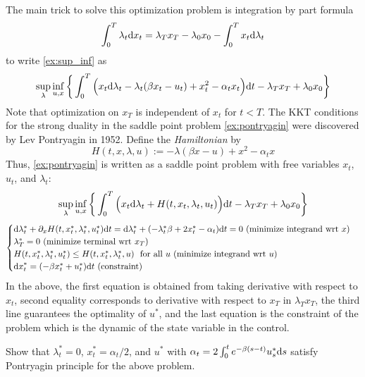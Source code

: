 \documentclass[11pt]{book}
\newcommand{\dd}{\text{\normalfont d}}
\newcommand{\dt}{\text{\normalfont d}t}
\newcommand{\ds}{\text{\normalfont d}s}
\newcommand{\dx}{\text{\normalfont d}x}
\begin{document}
The main trick to solve this optimization problem is integration by part formula
\begin{equation}\label{eqn:pontryagin_ibp}
    \int_0^T \lambda_t {\dx}_t = \lambda_T x_T - \lambda_0 x_0 - \int_0^T x_t{\dd}\lambda_t
\end{equation}
to write 
\eqref{ex:sup_inf} as
\begin{equation}\label{ex:pontryagin}
    \sup_{\lambda}\inf_{u,x}\bigg\{\int_0^T\Big(x_t {\dd}\lambda_t-\lambda_t( \beta x_t - u_t )+ x_t^2 - \alpha_t x_t \Big) {{\dt}} - \lambda_T x_T + \lambda_0 x_0\bigg\}
\end{equation}
Note that optimization on $x_T$ is independent of  $x_t$ for $t<T$. The KKT conditions for the strong duality in the saddle point problem \eqref{ex:pontryagin} were discovered by Lev Pontryagin in 1952. Define the \emph{Hamiltonian} by
\begin{equation}
    H(t,x,\lambda,u):=-\lambda( \beta x - u )+ x^2 - \alpha_t x
\end{equation}
Thus, \eqref{ex:pontryagin} is written as a saddle point problem with free variables $x_t$, $u_t$, and $\lambda_t$:
\begin{equation}
    \sup_{\lambda}\inf_{u,x}\bigg\{\int_0^T\Big(x_t {\dd}\lambda_t+ H(t,x_t,\lambda_t,u_t)\Big) {{\dt}} - \lambda_T x_T + \lambda_0 x_0\bigg\}
\end{equation}
\begin{equation}
    \begin{cases}
        {\dd}\lambda^*_t+ \partial_x H(t,x^*_t,\lambda^*_t,u^*_t){{\dt}}={\dd}\lambda^*_t+ (-\lambda^*_t \beta  +2x^*_t -\alpha_t){{\dt}}=0~ (\textrm{minimize integrand wrt $x$})\\
        \lambda^*_T=0 ~(\textrm{minimize terminal wrt $x_T$})\\
        H(t,x^*_t,\lambda^*_t,u^*_t)\le H(t,x^*_t,\lambda^*_t,u)~\textrm{ for all } u ~(\textrm{minimize integrand wrt $u$})\\
        {\dx}^*_t = (-\beta x^*_t + u^*_t) {{\dt}} ~(\textrm{constraint})
        \end{cases}
\end{equation}
In the above, the first equation  is obtained from taking derivative with respect to $x_t$, second equality corresponds to derivative with respect to $x_T$ in $\lambda_T x_T$, the third line guarantees the optimality of $u^*$, and the last equation is the  constraint of the problem which is the dynamic of the state variable in the control. 
\begin{ex}
    Show that $\lambda^*_t=0$, $x^*_t=\alpha_t/2$, and $u^*$ with $\alpha_t=2\int_0^te^{-\beta (s-t)}u^*_s {{\ds}}$ satisfy Pontryagin principle for the above problem. 
\end{ex}
\end{document}
